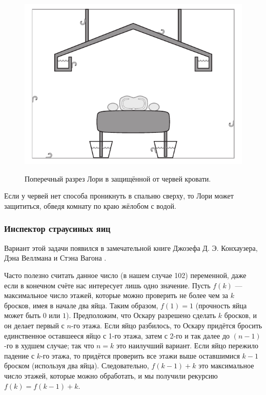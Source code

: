 \begin{figure}[h!]
\centering
\includegraphics[scale=0.5]{pics/chervi}
\label{pic:chervi}
\caption{Поперечный разрез Лори в защищённой от червей кровати.}
\end{figure}

Если у червей нет способа проникнуть в спальню сверху, то Лори может защититься, обведя комнату по краю жёлобом с водой.

\subsubsection*{Инспектор страусиных яиц}

Вариант этой задачи появился в замечательной книге Джозефа Д. Э. Конхаузера, Дэна Веллмана и Стэна Вагона \cite{konhauser-velleman-wagon}.

Часто полезно считать данное число (в нашем случае 102) переменной, даже если в конечном счёте нас интересует лишь одно значение.
Пусть $f(k)$ --- максимальное число этажей, которые можно проверить не более чем за $k$ бросков, имея в начале два яйца.
Таким образом, $f(1) = 1$ (прочность яйца может быть $0$ или $1$).
Предположим, что Оскару разрешено сделать $k$ бросков, и он делает первый с $n$-го этажа.
Если яйцо разбилось, то Оскару придётся бросить единственное оставшееся яйцо с 1-го этажа, затем с 2-го и так далее до $(n-1)$-го в худшем случае;
так что $n = k$ это наилучший вариант.
Если яйцо пережило падение с $k$-го этажа, то придётся проверить все этажи выше оставшимися $k-1$ броском (используя два яйца).
Следовательно, $f(k - 1) + k$ это максимальное число этажей, которые можно обработать,
и мы получили рекурсию $f(k) = f(k - 1) + k$.


